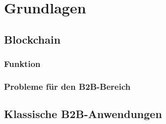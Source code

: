 \chapter{Grundlagen}
\label{cha:grundlagen}

\section{Blockchain}

\subsection{Funktion}
\subsection{Probleme für den B2B-Bereich}

\section{Klassische B2B-Anwendungen}
